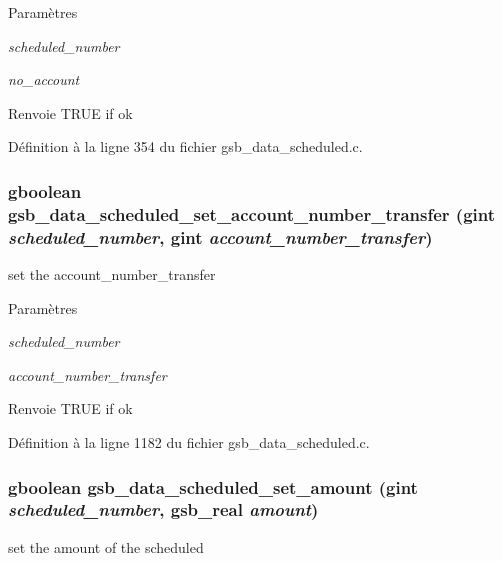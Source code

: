 \begin{DoxyParams}{Paramètres}
\item[{\em scheduled\_\-number}]\item[{\em no\_\-account}]\end{DoxyParams}
\begin{DoxyReturn}{Renvoie}
TRUE if ok 
\end{DoxyReturn}


Définition à la ligne 354 du fichier gsb\_\-data\_\-scheduled.c.

\subsubsection[{gsb\_\-data\_\-scheduled\_\-set\_\-account\_\-number\_\-transfer}]{\setlength{\rightskip}{0pt plus 5cm}gboolean gsb\_\-data\_\-scheduled\_\-set\_\-account\_\-number\_\-transfer (gint {\em scheduled\_\-number}, \/  gint {\em account\_\-number\_\-transfer})}\label{gsb__data__scheduled_8h_ae87ba81a40b3b2906f57caf4234cb92f}
set the account\_\-number\_\-transfer


\begin{DoxyParams}{Paramètres}
\item[{\em scheduled\_\-number}]\item[{\em account\_\-number\_\-transfer}]\end{DoxyParams}
\begin{DoxyReturn}{Renvoie}
TRUE if ok 
\end{DoxyReturn}


Définition à la ligne 1182 du fichier gsb\_\-data\_\-scheduled.c.

\subsubsection[{gsb\_\-data\_\-scheduled\_\-set\_\-amount}]{\setlength{\rightskip}{0pt plus 5cm}gboolean gsb\_\-data\_\-scheduled\_\-set\_\-amount (gint {\em scheduled\_\-number}, \/  {\bf gsb\_\-real} {\em amount})}\label{gsb__data__scheduled_8h_a7015befa34c5a73725f1ba06512b5a09}
set the amount of the scheduled


